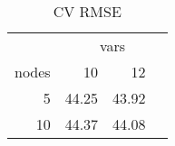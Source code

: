 \begin{table}

\caption{\label{tab:}CV RMSE}
\centering
\begin{tabular}[t]{r|r|r}
\hline
\multicolumn{1}{c|}{ } & \multicolumn{3}{c}{vars} \\
\cline{2-4}
nodes & 10 & 12\\
\hline
5 & 44.25 & 43.92\\
\hline
10 & 44.37 & 44.08\\
\hline
\end{tabular}
\end{table}